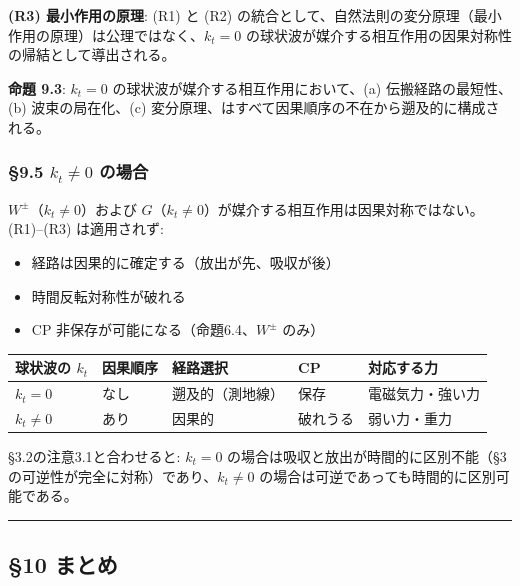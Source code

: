 \documentclass[
  a4paper,11pt]{ltjsarticle}
\newcounter{none}
\providecommand{\tightlist}{%
  \setlength{\itemsep}{0pt}\setlength{\parskip}{0pt}}
\theoremstyle{definition}
\theoremstyle{remark}
\begin{document}
\textbf{(R3) 最小作用の原理}: (R1) と (R2)
の統合として、自然法則の変分原理（最小作用の原理）は公理ではなく、\(k_t = 0\)
の球状波が媒介する相互作用の因果対称性の帰結として導出される。

\textbf{命題 9.3}: \(k_t = 0\) の球状波が媒介する相互作用において、(a)
伝搬経路の最短性、(b) 波束の局在化、(c)
変分原理、はすべて因果順序の不在から遡及的に構成される。

\subsubsection{\texorpdfstring{§9.5 \(k_t \neq 0\)
の場合}{§9.5 k\_t \textbackslash neq 0 の場合}}\label{k_t-neq-0-ux306eux5834ux5408}

\(W^{\pm}\)（\(k_t \neq 0\)）および
\(G\)（\(k_t \neq 0\)）が媒介する相互作用は因果対称ではない。(R1)--(R3)
は適用されず:

\begin{itemize}
\tightlist
\item
  経路は因果的に確定する（放出が先、吸収が後）
\item
  時間反転対称性が破れる
\item
  CP 非保存が可能になる（命題6.4、\(W^{\pm}\) のみ）
\end{itemize}

{\def\LTcaptype{none} %
\begin{longtable}[]{@{}lllll@{}}
\toprule\noalign{}
球状波の \(k_t\) & 因果順序 & 経路選択 & CP & 対応する力 \\
\midrule\noalign{}
\endhead
\bottomrule\noalign{}
\endlastfoot
\(k_t = 0\) & なし & 遡及的（測地線） & 保存 & 電磁気力・強い力 \\
\(k_t \neq 0\) & あり & 因果的 & 破れうる & 弱い力・重力 \\
\end{longtable}
}

§3.2の注意3.1と合わせると: \(k_t = 0\)
の場合は吸収と放出が時間的に区別不能（§3の可逆性が完全に対称）であり、\(k_t \neq 0\)
の場合は可逆であっても時間的に区別可能である。

\begin{center}\rule{0.5\linewidth}{0.5pt}\end{center}

\subsection{§10 まとめ}\label{ux307eux3068ux3081}
\end{document}
